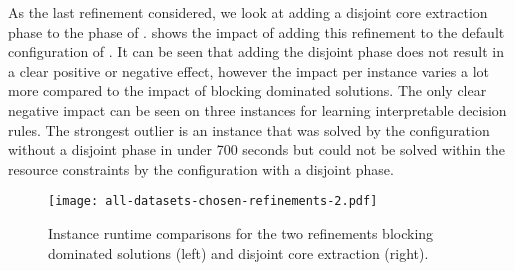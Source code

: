 As the last refinement considered, we look at adding a disjoint core extraction phase to the \msu{} phase of \msh{}.
 shows the impact of adding this refinement to the default configuration of \msh{}.
It can be seen that adding the disjoint phase does not result in a clear positive or negative effect, however the impact per instance varies a lot more compared to the impact of blocking dominated solutions.
The only clear negative impact can be seen on three instances for learning interpretable decision rules.
The strongest outlier is an instance that was solved by the configuration without a disjoint phase in under 700 seconds but could not be solved within the resource constraints by the configuration with a disjoint phase.

\begin{figure}
    \centering
    \texttt{[image: all-datasets-chosen-refinements-2.pdf]}
    \caption{Instance runtime comparisons for the two refinements blocking dominated solutions (left) and disjoint core extraction (right).}\label{fig:refinements-2}
\end{figure}